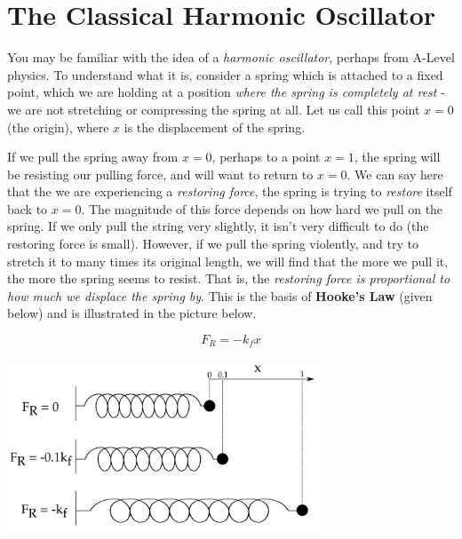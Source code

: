 \documentclass{memoir}[11pt,oneside,a4paper,openany]
\begin{document}
\section{The Classical Harmonic Oscillator}
You may be familiar with the idea of a \emph{harmonic oscillator}, perhaps from A-Level physics. To understand what it is, consider a spring which is attached to a fixed point, which we are holding at a position \emph{where the spring is completely at rest} - we are not stretching or compressing the spring at all. Let us call this point $x=0$ (the origin), where $x$ is the displacement of the spring. 

If we pull the spring away from $x=0$, perhaps to a point $x=1$, the spring will be resisting our pulling force, and will want to return to $x=0$. We can say here that the we are experiencing a \emph{restoring force}, the spring is trying to \emph{restore} itself back to $x=0$. The magnitude of this force depends on how hard we pull on the spring. If we only pull the string very slightly, it isn't very difficult to do (the restoring force is small). However, if we pull the spring violently, and try to stretch it to many times its original length, we will find that the more we pull it, the more the spring seems to resist. That is, the \emph{restoring force is proportional to how much we displace the spring by}. This is the basis of \textbf{Hooke's Law} (given below) and is illustrated in the picture below. 

\begin{minipage}{0.3\textwidth}
\begin{equation}
	F_R = -k_f x
\end{equation}
\end{minipage}
\hspace{2cm}
\begin{minipage}{0.6\textwidth}
	\centering
	\includegraphics[width=0.7\textwidth]{hooke_law.png}
\end{minipage}
\end{document}
